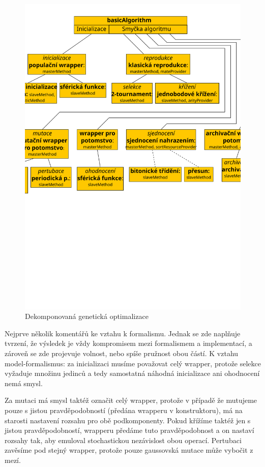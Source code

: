 \begin{figure}[h!]
\begin{center}
  \includegraphics[width=\textwidth]{img/GO}
  \caption{Dekomponovaná genetická optimalizace}\label{GO dekomp}
  \end{center}
\end{figure}

Nejprve několik komentářů ke vztahu k formalismu. Jednak se zde naplňuje tvrzení, že výsledek je vždy kompromisem mezi formalismem a implementací, a zároveň se zde projevuje volnost, nebo spíše pružnost obou částí. K vztahu model-formalismus: za inicializaci musíme považovat celý wrapper, protože selekce vyžaduje množinu jedinců a tedy samostatná náhodná inicializace ani ohodnocení nemá smysl.

Za mutaci má smysl taktéž označit celý wrapper, protože v případě že mutujeme pouze s jistou pravděpodobností (předána wrapperu v konstruktoru), má na starosti nastavení rozsahu pro obě podkomponenty. Pokud křížíme taktéž jen s jistou pravděpodobností, wrapperu předáme tuto pravděpodobnost a on nastaví rozsahy tak, aby emuloval stochastickou nezávislost obou operací. Pertubaci zavěsíme pod stejný wrapper, protože pouze gaussovská mutace může vybočit z mezí.

